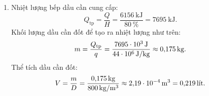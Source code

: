 \begin{vd}
{\begin{enumerate}[label=\alph*)]
\begin{itemize}
					$$Q_3=mc_\text{n}\left(\SI{100}{\celsius}-\SI{0}{\celsius}\right)=\left(\SI{2}{\kilogram}\right)\cdot\left[\SI{4200}{\joule/\left(\kilogram\cdot\kelvin\right)}\right]\cdot\left(\SI{100}{\celsius}\right)=\SI{840}{\kilo\joule}.$$
					\item Nước hoá hơi hoàn toàn ở $\SI{100}{\celsius}$:
					$$Q_4=mL=\left(\SI{2}{\kilogram}\right)\cdot\left(\SI{23E5}{\joule/\kilogram}\right)=\SI{4600}{\kilo\joule}.$$
				\end{itemize}
				Tổng nhiệt lượng đá cần thu vào để hoá hơi hoàn toàn ở $\SI{100}{\celsius}$:
				$$Q=Q_1+Q_2+Q_3+Q_4=\SI{6156}{\kilo\joule}.$$
				\item Nhiệt lượng bếp dầu cần cung cấp:
				$$Q_\text{tp}=\dfrac{Q}{H}=\dfrac{\SI{6156}{\kilo\joule}}{\SI{80}{\percent}}=\SI{7695}{\kilo\joule}.$$
				Khối lượng dầu cần đốt để tạo ra nhiệt lượng như trên:
				$$m=\dfrac{Q_\text{tp}}{q}=\dfrac{\SI{7695E3}{\joule}}{\SI{44E6}{\joule/\kilogram}}\approx\SI{0.175}{\kilogram}.$$
				Thể tích dầu cần đốt:
				$$V=\dfrac{m}{D}=\dfrac{\SI{0.175}{\kilogram}}{\SI{800}{\kilogram/\meter^3}}\approx\SI{2.19E-4}{\meter^3}=\SI{0.219}{\text{lít}}.$$
			\end{enumerate}
		}
	
\end{vd}
